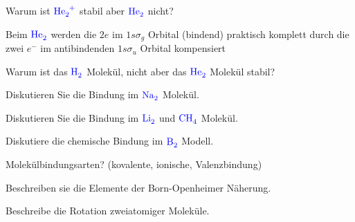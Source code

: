 \documentclass[a5paper,12pt,ngerman,print,grid=front]{kartei}
\let\oldce\ce
\renewcommand*{\ce}[1]{\begingroup\color{blue}\oldce{#1}\endgroup}
\begin{document}
    
    \begin{karte}{
        Warum ist $\ce{He2+}$ stabil aber $\ce{He2}$ nicht?
        }
        
        Beim $\ce{He2}$ werden die $2e$ im $1s \sigma_g$ Orbital (bindend) praktisch komplett durch die zwei $e^-$ im antibindenden $1s\sigma_u$ Orbital kompensiert
                
    \end{karte}

  
    \begin{karte}{
        Warum ist das $\ce{H2}$ Molekül, nicht aber das $\ce{He2}$ Molekül stabil?
        }
    \end{karte}
  
  
    \begin{karte}{
        Diskutieren Sie die Bindung im $\ce{Na2}$ Molekül.
        }
    \end{karte}
  
  
    \begin{karte}{
        Diskutieren Sie die Bindung im $\ce{Li2}$ und $\ce{CH4}$ Molekül.
        }
    \end{karte}
  
  
    \begin{karte}{
        Diskutiere die chemische Bindung im $\ce{B2}$ Modell.
        }
    \end{karte}
  
  
    \begin{karte}{
        Molekülbindungsarten? (kovalente, ionische, Valenzbindung)
        }
    \end{karte}
  
  
	\begin{karte}{
		Beschreiben sie die Elemente der Born-Openheimer Näherung.
        }
          
          
          
    \end{karte}


	\begin{karte}{
		Beschreibe die Rotation zweiatomiger Moleküle.
        }
          
          
          
    \end{karte}
\end{document}
